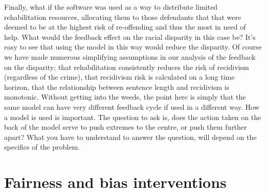 Finally, what if the software was used as a way to distribute limited rehabilitation resources, allocating them to those defendants that that were deemed to be at the highest risk of re-offending and thus the most in need of help. What would the feedback effect on the racial disparity in this case be? It's easy to see that using the model in this way would reduce the disparity. Of course we have made numerous simplifying assumptions in our analysis of the feedback on the disparity; that rehabilitation consistently reduces the risk of recidivism (regardless of the crime), that recidivism risk is calculated on a long time horizon, that the relationship between sentence length and recidivism is monotonic. Without getting into the weeds, the point here is simply that the same model can have very different feedback cycle if used in a different way. How a model is used is important. The question to ask is, does the action taken on the back of the model serve to push extremes to the centre, or push them further apart? What you have to understand to answer the question, will depend on the specifics of the problem.

\section{Fairness and bias interventions}

